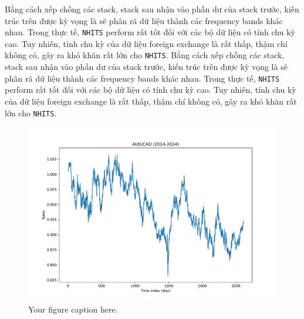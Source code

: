 \documentclass[aps,prb,groupedaddress,twocolumn,showpacs,dvipdfmx, superscriptaddress,pdftex]{revtex4-2}
\begin{document}
Bằng cách xếp chồng các stack, stack sau nhận vào phần dư của stack trước, kiến trúc trên được kỳ vọng là sẽ phân rã dữ liệu thành các frequency bands khác nhau. Trong thực tế, \verb|NHITS| perform rất tốt đối với các bộ dữ liệu có tính chu kỳ cao. Tuy nhiên, tính chu kỳ của dữ liệu foreign exchange là rất thấp, thậm chí không có, gây ra khó khăn rất lớn cho \verb|NHITS|.
Bằng cách xếp chồng các stack, stack sau nhận vào phần dư của stack trước, kiến trúc trên được kỳ vọng là sẽ phân rã dữ liệu thành các frequency bands khác nhau. Trong thực tế, \verb|NHITS| perform rất tốt đối với các bộ dữ liệu có tính chu kỳ cao. Tuy nhiên, tính chu kỳ của dữ liệu foreign exchange là rất thấp, thậm chí không có, gây ra khó khăn rất lớn cho \verb|NHITS|.


\begin{figure}
  \centering
  \includegraphics[width=\linewidth]{img/meo.pdf}
  \caption{Your figure caption here.}
  \label{fig:your-label}
\end{figure}



\end{document}
